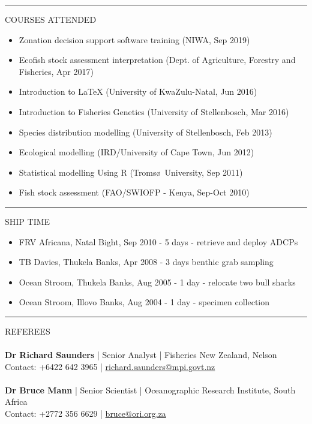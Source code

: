 \documentclass[10pt,a4paper]{article}
\begin{document}
\hrule
\vspace{6pt}
\noindent
COURSES ATTENDED
	\begin{itemize}
		\setlength\itemsep{0.05em}
		\item Zonation decision support software training (NIWA, Sep 2019)
		\item Ecofish stock assessment interpretation (Dept. of Agriculture, Forestry and Fisheries, Apr 2017)
		\item Introduction to \LaTeX{} (University of KwaZulu-Natal, Jun 2016)
		\item Introduction to Fisheries Genetics (University of Stellenbosch, Mar 2016)
		\item Species distribution modelling (University of Stellenbosch, Feb 2013) 
		\item Ecological modelling (IRD/University of Cape Town, Jun 2012)
		\item Statistical modelling Using R (Troms\o\ University, Sep 2011)
		\item Fish stock assessment (FAO/SWIOFP - Kenya, Sep-Oct 2010)
	\end{itemize}
\hrule
\vspace{6pt}
\noindent
SHIP TIME
	\begin{itemize}
		\setlength\itemsep{0.05em}
		\item FRV Africana, Natal Bight, Sep 2010 - 5 days - retrieve and deploy ADCPs
		\item TB Davies, Thukela Banks, Apr 2008 - 3 days benthic grab sampling
		\item Ocean Stroom, Thukela Banks, Aug 2005 - 1 day - relocate two bull sharks
		\item Ocean Stroom, Illovo Banks, Aug 2004 - 1 day - specimen collection
	\end{itemize}
\hrule
\vspace{6pt}
\noindent
REFEREES
\\
\\
\textbf{Dr Richard Saunders} | Senior Analyst | Fisheries New Zealand, Nelson\\
Contact: +6422 642 3965 | \href{mailto:richard.saunders@mpi.govt.nz}{richard.saunders@mpi.govt.nz}\\
\\
\noindent
\textbf{Dr Bruce Mann} | Senior Scientist | Oceanographic Research Institute, South Africa\\
Contact: +2772 356 6629 | \href{mailto:bruce@ori.org.za}{bruce@ori.org.za}\\
\\
\end{document}
